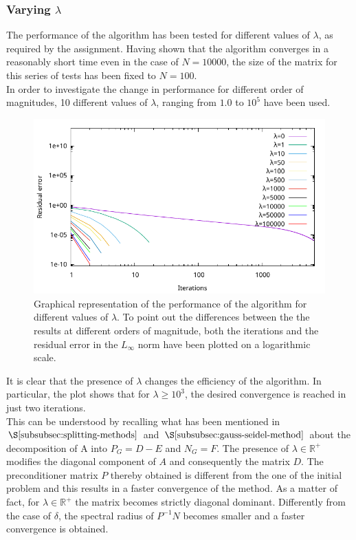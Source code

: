 \documentclass[11pt]{article}
\theoremstyle{theorem}
\theoremstyle{definition}
\begin{document}
\subsubsection{Varying $\lambda$}
The performance of the algorithm has been tested for different values of $\lambda$, as required by the assignment. Having shown that the algorithm converges in a reasonably short time even in the case of $N=10000$, the size of the matrix for this series of tests has been fixed to $N=100$.\\
In order to investigate the change in performance for different order of magnitudes, 10 different values of $\lambda$, ranging from $1.0$ to $10^5$ have been used.

\begin{figure}[H]
	\begin{center}
		\includegraphics[width=1.0\textwidth]{Gauss_Seidel_lambda}
	\end{center}
	\caption{Graphical representation of the performance of the algorithm for different values of $\lambda$. To point out the differences between the the results at different orders of magnitude, both the iterations and the residual error in the $L_\infty$ norm have been plotted on a logarithmic scale.
		\label{fig:lambda}}
\end{figure} 

It is clear that the presence of $\lambda$ changes the efficiency of the algorithm. In particular, the plot shows that for $\lambda\ge10^3$, the desired convergence is reached in just two iterations.\\
This can be understood by recalling what has been mentioned in $\S\ref{subsubsec:splitting-methods}$ and $\S\ref{subsubsec:gauss-seidel-method}$ about the decomposition of A into $P_G=D-E$ and $N_G=F$. The presence of $\lambda\in\mathbb{R}^{+}$ modifies the diagonal component of $A$ and consequently the matrix $D$. The preconditioner matrix $P$ thereby obtained is different from the one of the initial problem and this results in a faster convergence of the method. As a matter of fact, for $\lambda\in\mathbb{R}^{+}$ the matrix becomes strictly diagonal dominant. Differently from the case of $\delta$, the spectral radius of $P^{-1}N$ becomes smaller and a faster convergence is obtained.\\
\end{document}
